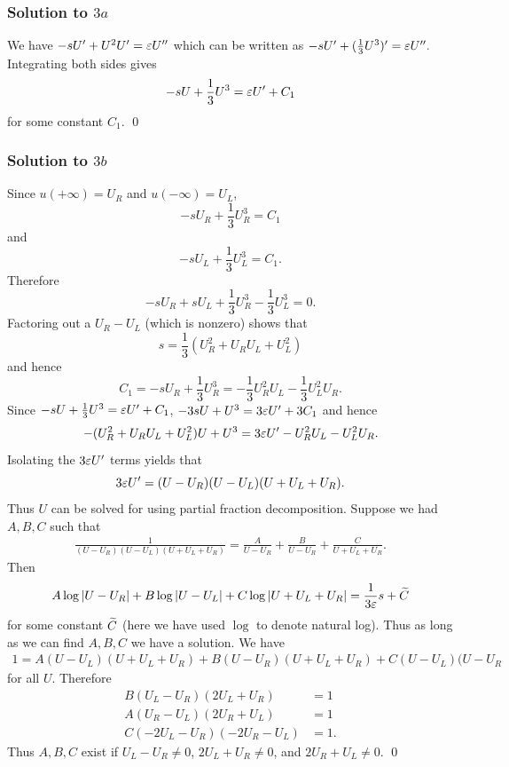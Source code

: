 \subsubsection*{Solution to $3a$}
We have $-sU' + U^{2}U' = \varepsilon U''$ which can be written as $-sU' + (\frac{1}{3}U^{3})' = \varepsilon U''.$
Integrating both sides gives
$$-sU + \frac{1}{3}U^{3} = \varepsilon U' + C_{1}$$
for some constant $C_{1}$.
\hfill\qed

\subsubsection*{Solution to $3b$}
Since $u(+\infty) = U_{R}$ and $u(-\infty) = U_{L}$,
$$-sU_{R} + \frac{1}{3}U_{R}^{3} = C_{1}$$
and
$$-sU_{L} + \frac{1}{3}U_{L}^{3} = C_{1}.$$
Therefore
$$-sU_{R} + sU_{L} + \frac{1}{3}U_{R}^{3} - \frac{1}{3}U_{L}^{3} = 0.$$
Factoring out a $U_{R} - U_{L}$ (which is nonzero) shows that
$$s = \frac{1}{3}(U_{R}^{2} + U_{R}U_{L} + U_{L}^{2})$$ and hence
$$C_{1} = -sU_{R} + \frac{1}{3}U_{R}^{3} = -\frac{1}{3}U_{R}^{2}U_{L} - \frac{1}{3}U_{L}^{2}U_{R}.$$
Since $-sU + \frac{1}{3}U^{3} = \varepsilon U' + C_{1}$,
$-3sU + U^{3} = 3\varepsilon U' + 3C_{1}$ and hence
$$-(U_{R}^{2} + U_{R}U_{L} + U_{L}^{2})U + U^{3} = 3\varepsilon U' - U_{R}^{2}U_{L} - U_{L}^{2}U_{R}.$$
Isolating the $3\varepsilon U'$ terms yields that
$$3\varepsilon U' = (U - U_{R})(U - U_{L})(U + U_{L} + U_{R}).$$
Thus $U$ can be solved for using partial fraction decomposition. Suppose we had $A, B, C$ such that
\begin{align}\label{s123beq1}
\frac{1}{(U - U_{R})(U - U_{L})(U + U_{L} + U_{R})} = \frac{A}{U - U_{R}} + \frac{B}{U - U_{R}} + \frac{C}{U + U_{L} + U_{R}}.
\end{align}
Then
$$A\log|U - U_{R}| + B\log|U - U_{L}| + C\log|U + U_{L} + U_{R}| = \frac{1}{3\varepsilon}s + \widetilde{C}$$
for some constant $\widetilde{C}$ (here we have used $\log$ to denote natural log). Thus as long as we can find $A, B, C$ we have a
solution. We have
\begin{align*}
1 = A(U - U_{L})(U + U_{L} + U_{R}) + B(U - U_{R})(U + U_{L} + U_{R}) + C(U - U_{L})(U - U_{R}
\end{align*}
for all $U$. Therefore
\begin{align*}
B(U_{L} - U_{R})(2U_{L} + U_{R}) &= 1\\
A(U_{R} - U_{L})(2U_{R} + U_{L}) & = 1\\
C(-2U_{L} - U_{R})(-2U_{R} - U_{L}) &= 1.
\end{align*}
Thus $A, B, C$ exist if $U_{L} - U_{R} \neq 0$, $2U_{L} + U_{R} \neq 0$, and $2U_{R} + U_{L} \neq 0$.
\hfill\qed

